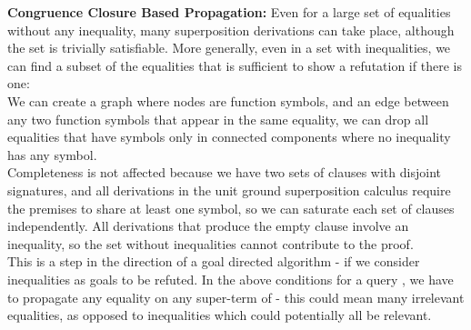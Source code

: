 \textbf{Congruence Closure Based Propagation:}
Even for a large set of equalities without any inequality,
many superposition derivations can take place, although the set is trivially satisfiable.
More generally, even in a set with inequalities, we can find a subset of the equalities that is sufficient to show a refutation if there is one:\\
We can create a graph where nodes are function symbols, and an edge between any two function symbols that appear in the same equality, 
we can drop all equalities that have symbols only in connected components where no inequality has any symbol.\\
Completeness is not affected because we have two sets of clauses with disjoint signatures, 
and all derivations in the unit ground superposition calculus require the premises to share at least one symbol, 
so we can saturate each set of clauses independently. 
All derivations that produce the empty clause involve an inequality, so the set without inequalities cannot contribute to the proof.\\
This is a step in the direction of a goal directed algorithm - if we consider inequalities as goals to be refuted.
In the above conditions for a query , we have to propagate any equality on any super-term of  - this could mean many irrelevant equalities, as opposed to inequalities which could potentially all be relevant.


